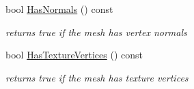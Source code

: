 \begin{Indent}
\begin{DoxyCompactItemize}
bool \mbox{\hyperlink{classcy_1_1_tri_mesh_ae989ce9d52a27e62acfb98a21584bcf9}{Has\+Normals}} () const
\begin{DoxyCompactList}\small\item\em returns true if the mesh has vertex normals \end{DoxyCompactList}\item 
\mbox{\label{classcy_1_1_tri_mesh_ac82d9d8a4cbadc06cd8ab3dc9b83ec4f}} 
bool \mbox{\hyperlink{classcy_1_1_tri_mesh_ac82d9d8a4cbadc06cd8ab3dc9b83ec4f}{Has\+Texture\+Vertices}} () const
\begin{DoxyCompactList}\small\item\em returns true if the mesh has texture vertices \end{DoxyCompactList}\end{DoxyCompactItemize}
\end{Indent}
